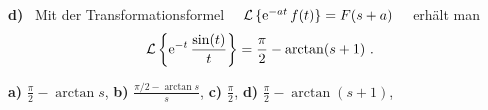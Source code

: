 {\textbf{d)} \ Mit der Transformationsformel \ \ ${\cal{L}}\left\{\mathrm{e}^{-at}\,f(t)\right\} = F(s+a)$ \ \ erhält man
	\[
	{\cal{L}}\left\{\mathrm{e}^{-t}\,\frac{\sin(t)}{t}\right\} = \dfrac \pi2-\arctan(s+1)\ .
\]


%
%
%

}

{
\textbf{ a)} $\frac \pi 2 - \arctan s$, 
\textbf{ b)} $\frac {\pi/2-\arctan s} s$, 
\textbf{ c)} $\frac \pi 2$,
\textbf{ d)} $\frac \pi 2 - \arctan (s+1)$,
}
